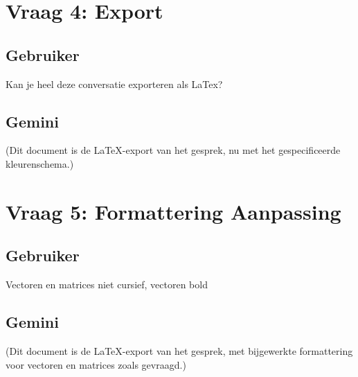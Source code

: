 \documentclass[12pt,a4paper]{article}
\begin{document}
\section*{Vraag 4: Export}

\subsection*{Gebruiker}

Kan je heel deze conversatie exporteren als LaTex?

\subsection*{Gemini}

(Dit document is de LaTeX-export van het gesprek, nu met het gespecificeerde kleurenschema.)

\section*{Vraag 5: Formattering Aanpassing}

\subsection*{Gebruiker}

Vectoren en matrices niet cursief, vectoren bold

\subsection*{Gemini}

(Dit document is de LaTeX-export van het gesprek, met bijgewerkte formattering voor vectoren en matrices zoals gevraagd.)
\end{document}
